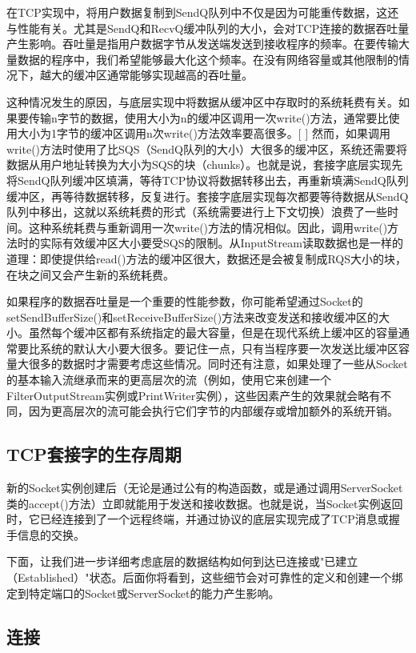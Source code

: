 	在TCP实现中，将用户数据复制到SendQ队列中不仅是因为可能重传数据，这还与性能有关。尤其是SendQ和RecvQ缓冲队列的大小，会对TCP连接的数据吞吐量产生影响。吞吐量是指用户数据字节从发送端发送到接收程序的频率。在要传输大量数据的程序中，我们希望能够最大化这个频率。在没有网络容量或其他限制的情况下，越大的缓冲区通常能够实现越高的吞吐量。

	这种情况发生的原因，与底层实现中将数据从缓冲区中存取时的系统耗费有关。如果要传输n字节的数据，使用大小为n的缓冲区调用一次write()方法，通常要比使用大小为1字节的缓冲区调用n次write()方法效率要高很多。[ ] 然而，如果调用write()方法时使用了比SQS（SendQ队列的大小）大很多的缓冲区，系统还需要将数据从用户地址转换为大小为SQS的块（chunks）。也就是说，套接字底层实现先将SendQ队列缓冲区填满，等待TCP协议将数据转移出去，再重新填满SendQ队列缓冲区，再等待数据转移，反复进行。套接字底层实现每次都要等待数据从SendQ队列中移出，这就以系统耗费的形式（系统需要进行上下文切换）浪费了一些时间。这种系统耗费与重新调用一次write()方法的情况相似。因此，调用write()方法时的实际有效缓冲区大小要受SQS的限制。从InputStream读取数据也是一样的道理：即使提供给read()方法的缓冲区很大，数据还是会被复制成RQS大小的块，在块之间又会产生新的系统耗费。

	如果程序的数据吞吐量是一个重要的性能参数，你可能希望通过Socket的setSendBufferSize()和setReceiveBufferSize()方法来改变发送和接收缓冲区的大小。虽然每个缓冲区都有系统指定的最大容量，但是在现代系统上缓冲区的容量通常要比系统的默认大小要大很多。要记住一点，只有当程序要一次发送比缓冲区容量大很多的数据时才需要考虑这些情况。同时还有注意，如果处理了一些从Socket的基本输入流继承而来的更高层次的流（例如，使用它来创建一个FilterOutputStream实例或PrintWriter实例），这些因素产生的效果就会略有不同，因为更高层次的流可能会执行它们字节的内部缓存或增加额外的系统开销。


	\subsection{TCP套接字的生存周期}

		新的Socket实例创建后（无论是通过公有的构造函数，或是通过调用ServerSocket类的accept()方法）立即就能用于发送和接收数据。也就是说，当Socket实例返回时，它已经连接到了一个远程终端，并通过协议的底层实现完成了TCP消息或握手信息的交换。

		下面，让我们进一步详细考虑底层的数据结构如何到达已连接或"已建立（Established）"状态。后面你将看到，这些细节会对可靠性的定义和创建一个绑定到特定端口的Socket或ServerSocket的能力产生影响。

		\subsection{连接}

